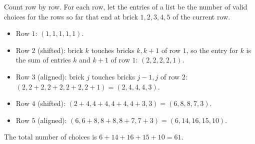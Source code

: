 Count row by row. For each row, let the entries of a list be the number of valid choices for the rows so far that end at brick $1,2,3,4,5$ of the current row.
\begin{itemize}
\item Row $1$: $(1,1,1,1,1)$.
\item Row $2$ (shifted): brick $k$ touches bricks $k,k+1$ of row $1$, so the entry for $k$ is the sum of entries $k$ and $k+1$ of row $1$: $(2,2,2,2,1)$.
\item Row $3$ (aligned): brick $j$ touches bricks $j-1,j$ of row $2$: $(2,2+2,2+2,2+2,2+1)=(2,4,4,4,3)$.
\item Row $4$ (shifted): $(2+4,4+4,4+4,4+3,3)=(6,8,8,7,3)$.
\item Row $5$ (aligned): $(6,6+8,8+8,8+7,7+3)=(6,14,16,15,10)$.
\end{itemize}
The total number of choices is $6+14+16+15+10=\boxed{61}$.
